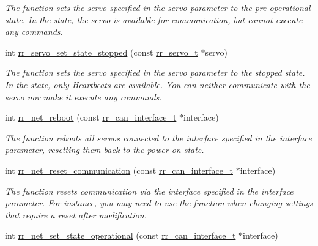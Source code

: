 \begin{DoxyCompactItemize}
\begin{DoxyCompactList}\small\item\em The function sets the servo specified in the \textquotesingle{}servo\textquotesingle{} parameter to the pre-\/operational state. In the state, the servo is available for communication, but cannot execute any commands. \end{DoxyCompactList}\item 
int \hyperlink{group___system__control_ga02ca530236f87db0fcac9e136eafda4d}{rr\+\_\+servo\+\_\+set\+\_\+state\+\_\+stopped} (const \hyperlink{structrr__servo__t}{rr\+\_\+servo\+\_\+t} $\ast$servo)
\begin{DoxyCompactList}\small\item\em The function sets the servo specified in the \textquotesingle{}servo\textquotesingle{} parameter to the stopped state. In the state, only Heartbeats are available. You can neither communicate with the servo nor make it execute any commands. \end{DoxyCompactList}\item 
int \hyperlink{group___system__control_ga3141174e38250e0107cc6de9681bcc47}{rr\+\_\+net\+\_\+reboot} (const \hyperlink{structrr__can__interface__t}{rr\+\_\+can\+\_\+interface\+\_\+t} $\ast$interface)
\begin{DoxyCompactList}\small\item\em The function reboots all servos connected to the interface specified in the \textquotesingle{}interface\textquotesingle{} parameter, resetting them back to the power-\/on state. \end{DoxyCompactList}\item 
int \hyperlink{group___system__control_ga7591c01ec4b20388fad7effe3266e3b1}{rr\+\_\+net\+\_\+reset\+\_\+communication} (const \hyperlink{structrr__can__interface__t}{rr\+\_\+can\+\_\+interface\+\_\+t} $\ast$interface)
\begin{DoxyCompactList}\small\item\em The function resets communication via the interface specified in the \textquotesingle{}interface\textquotesingle{} parameter. For instance, you may need to use the function when changing settings that require a reset after modification. \end{DoxyCompactList}\item 
int \hyperlink{group___system__control_ga427f81205fc35a78a351d1288ea67165}{rr\+\_\+net\+\_\+set\+\_\+state\+\_\+operational} (const \hyperlink{structrr__can__interface__t}{rr\+\_\+can\+\_\+interface\+\_\+t} $\ast$interface)

\end{DoxyCompactItemize}
